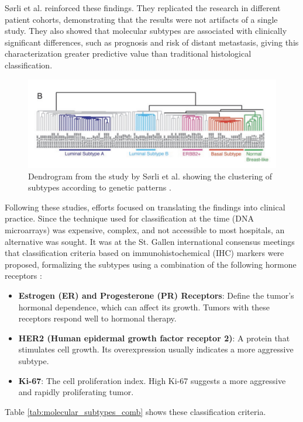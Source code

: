 \documentclass[a4paper,10pt]{book}
\begin{document}
Sørli et al. reinforced these findings. They replicated the research in different patient cohorts, demonstrating that the results were not artifacts of a single study. They also showed that molecular subtypes are associated with clinically significant differences, such as prognosis and risk of distant metastasis, giving this characterization greater predictive value than traditional histological classification.

\begin{figure}
	\centering
	\includegraphics[width=0.8\linewidth]{reports//assets/dendogram.png}
	\caption{Dendrogram from the study by Sørli et al. showing the clustering of subtypes according to genetic patterns \cite{sorlie_repeated_2003}.}
	\label{fig:sorlie-dandrogram}
\end{figure}

Following these studies, efforts focused on translating the findings into clinical practice. Since the technique used for classification at the time (DNA microarrays) was expensive, complex, and not accessible to most hospitals, an alternative was sought. It was at the St. Gallen international consensus meetings that classification criteria based on immunohistochemical (IHC) markers were proposed, formalizing the subtypes using a combination of the following hormone receptors \cite{lips_breast_2013}:

\begin{itemize}
	\item \textbf{Estrogen (ER) and Progesterone (PR) Receptors}: Define the tumor’s hormonal dependence, which can affect its growth. Tumors with these receptors respond well to hormonal therapy.
	\item \textbf{HER2 (Human epidermal growth factor receptor 2)}: A protein that stimulates cell growth. Its overexpression usually indicates a more aggressive subtype.
	\item \textbf{Ki-67}: The cell proliferation index. High Ki-67 suggests a more aggressive and rapidly proliferating tumor.
\end{itemize}

Table \ref{tab:molecular_subtypes_comb} shows these classification criteria.
\end{document}
